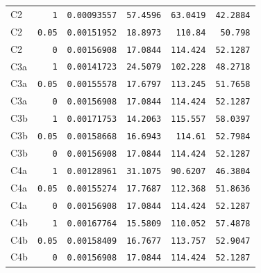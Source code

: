 \begin{longtable}{lrrrrr}
C2 & \texttt{1} & \texttt{0.00093557} & \texttt{57.4596} & \texttt{63.0419} & \texttt{42.2884} \\
C2 & \texttt{0.05} & \texttt{0.00151952} & \texttt{18.8973} & \texttt{110.84} & \texttt{50.798} \\
C2 & \texttt{0} & \texttt{0.00156908} & \texttt{17.0844} & \texttt{114.424} & \texttt{52.1287} \\
C3a & \texttt{1} & \texttt{0.00141723} & \texttt{24.5079} & \texttt{102.228} & \texttt{48.2718} \\
C3a & \texttt{0.05} & \texttt{0.00155578} & \texttt{17.6797} & \texttt{113.245} & \texttt{51.7658} \\
C3a & \texttt{0} & \texttt{0.00156908} & \texttt{17.0844} & \texttt{114.424} & \texttt{52.1287} \\
C3b & \texttt{1} & \texttt{0.00171753} & \texttt{14.2063} & \texttt{115.557} & \texttt{58.0397} \\
C3b & \texttt{0.05} & \texttt{0.00158668} & \texttt{16.6943} & \texttt{114.61} & \texttt{52.7984} \\
C3b & \texttt{0} & \texttt{0.00156908} & \texttt{17.0844} & \texttt{114.424} & \texttt{52.1287} \\
C4a & \texttt{1} & \texttt{0.00128961} & \texttt{31.1075} & \texttt{90.6207} & \texttt{46.3804} \\
C4a & \texttt{0.05} & \texttt{0.00155274} & \texttt{17.7687} & \texttt{112.368} & \texttt{51.8636} \\
C4a & \texttt{0} & \texttt{0.00156908} & \texttt{17.0844} & \texttt{114.424} & \texttt{52.1287} \\
C4b & \texttt{1} & \texttt{0.00167764} & \texttt{15.5809} & \texttt{110.052} & \texttt{57.4878} \\
C4b & \texttt{0.05} & \texttt{0.00158409} & \texttt{16.7677} & \texttt{113.757} & \texttt{52.9047} \\
C4b & \texttt{0} & \texttt{0.00156908} & \texttt{17.0844} & \texttt{114.424} & \texttt{52.1287} \\
\end{longtable}
\endgroup


